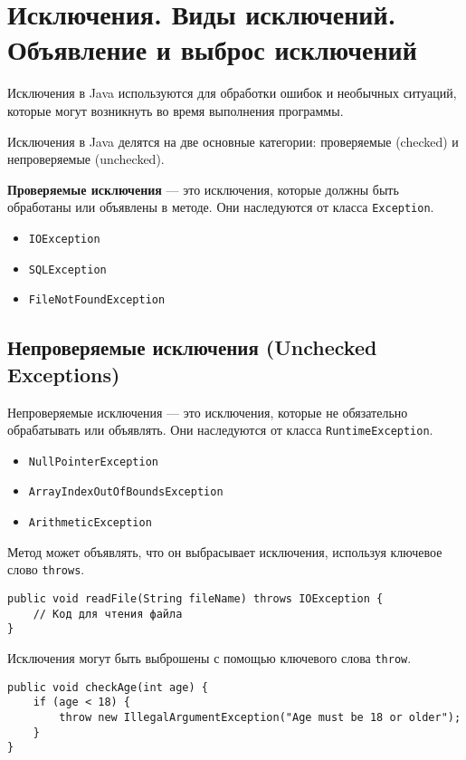 \documentclass[12pt, a4paper]{article}
\begin{document}
\section{Исключения. Виды исключений. Объявление и выброс исключений}
Исключения в Java используются для обработки ошибок и необычных ситуаций, которые могут возникнуть во время выполнения программы. 

Исключения в Java делятся на две основные категории: проверяемые (checked) и непроверяемые (unchecked).

\textbf{Проверяемые исключения }— это исключения, которые должны быть обработаны или объявлены в методе. Они наследуются от класса \texttt{Exception}.

\begin{itemize}
    \item \texttt{IOException}
    \item \texttt{SQLException}
    \item \texttt{FileNotFoundException}
\end{itemize}

\subsection*{Непроверяемые исключения (Unchecked Exceptions)}

Непроверяемые исключения — это исключения, которые не обязательно обрабатывать или объявлять. Они наследуются от класса \texttt{RuntimeException}.

\begin{itemize}
    \item \texttt{NullPointerException}
    \item \texttt{ArrayIndexOutOfBoundsException}
    \item \texttt{ArithmeticException}
\end{itemize}


Метод может объявлять, что он выбрасывает исключения, используя ключевое слово \texttt{throws}.

\begin{verbatim}
public void readFile(String fileName) throws IOException {
    // Код для чтения файла
}
\end{verbatim}

Исключения могут быть выброшены с помощью ключевого слова \texttt{throw}.

\begin{verbatim}
public void checkAge(int age) {
    if (age < 18) {
        throw new IllegalArgumentException("Age must be 18 or older");
    }
}
\end{verbatim}
\end{document}
